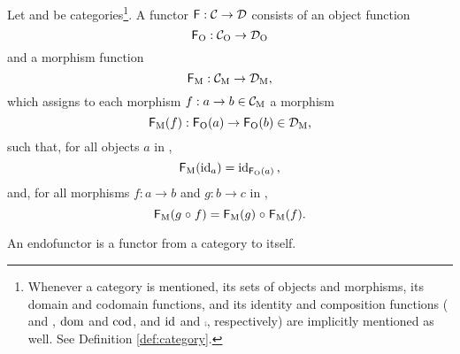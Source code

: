 \begin{definition}
  \label{def:functor}


  Let  and  be categories\footnote{Whenever a category
     is mentioned, its sets of objects and morphisms, its
    domain and codomain functions, and its identity and composition
    functions ( and , $\operatorname{dom}$ and $\operatorname{cod}$, and $\operatorname{id}$ and
    $\comp$, respectively) are implicitly mentioned as well. See
    Definition \ref{def:category}.}. A functor $\mathsf{F}: \mathcal{C} \to
  \mathcal{D}$ consists of an object function
  \begin{equation}
    \label{eq:functor-object}
    \mathsf{F}_{\operatorname{O}}: \mathcal{C}_{\operatorname{O}} \to \mathcal{D}_{\operatorname{O}}
  \end{equation}
  and a morphism function
  \begin{equation}
    \label{eq:functor-morphism}
    \mathsf{F}_{\operatorname{M}}: \mathcal{C}_{\operatorname{M}} \to \mathcal{D}_{\operatorname{M}}
    \text{,}
  \end{equation}
  which assigns to each morphism $f: a \to b \in \mathcal{C}_{\operatorname{M}}$ a morphism
  \begin{equation*}
    \mathsf{F}_{\operatorname{M}}(f): \mathsf{F}_{\operatorname{O}}(a) \to \mathsf{F}_{\operatorname{O}}(b) \in \mathcal{D}_{\operatorname{M}}
    \text{,}
  \end{equation*}
  such that, for all objects $a$ in ,
  \begin{equation}
    \label{eq:functor-identity}
    \mathsf{F}_{\operatorname{M}}(\operatorname{id}_{a}) = \operatorname{id}_{\mathsf{F}_{\operatorname{O}}(a)}
    \text{,}
  \end{equation}
  and, for all morphisms $f: a \to b$ and $g: b \to c$ in ,
  \begin{equation}
    \label{eq:functor-composition}
    \mathsf{F}_{\operatorname{M}}(g \mathrel{\circ} f) = \mathsf{F}_{\operatorname{M}}(g) \mathrel{\circ} \mathsf{F}_{\operatorname{M}}(f)
    \text{.}
  \end{equation}

\end{definition}

\begin{definition}
  \label{def:endofunctor}

  An endofunctor is a functor from a category to itself.

\end{definition}

